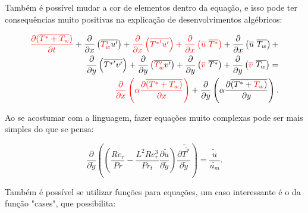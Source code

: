 Também é possível mudar a cor de elementos dentro da equação, e isso pode ter consequências muito positivas na explicação de desenvolvimentos algébricos:

\begin{center}
\begin{equation}
	\begin{split}
	\color{red}\frac{\partial ( \overline{ T^\ast + T_w } ) }{\partial t} \color{black} +
	\frac{\partial{}}{\partial{x}} \left(\overline{ \color{red}T_w^{\prime} \color{black} u^{\prime}}\right) +
	\color{red}\frac{\partial{}}{\partial{x}} \left(\overline{{T^{\ast}}^{\prime} u^{\prime}}\right)+ \color{black}
	\color{red} \frac{\partial{}}{\partial{x}}\left(\overline{u} \ \overline{T^{\ast}}\right) \color{black}+ 
	\frac{\partial{}}{\partial{x}}\left(\overline{u} \ \overline{T_w}\right)+ 
	\\
	\frac{\partial{}}{\partial{y}} \left(\overline{{T^{\ast}}^{\prime} v^{\prime}}\right)+
	\frac{\partial{}}{\partial{y}} \left(\overline{\color{red}T_w^\prime \color{black} v^\prime}\right) + \frac{\partial{}}{\partial{y}}\left(\color{red}\overline{v} \color{black} \ \overline{T^\ast}\right) +
	\frac{\partial{}}{\partial{y}}\left(\color{red}\overline{v}\color{black} \ \overline{T_w}\right) 
	= 
	\\
	\color{red}{\frac{\partial{}}{\partial{x}}} \left(\alpha {\frac{\partial{\overline{(T^\ast + T_w)}}}{\partial{x}}} \right) \color{black}+
	{\frac{\partial{}}{\partial{y}}} \left(\alpha {\frac{\partial{\overline{(T^\ast + \color{red} T_w \color{black})}}}{\partial{y}}} \right) .
	\end{split}
\end{equation}
\end{center}

Ao se acostumar com a linguagem, fazer equações muito complexas pode ser mais simples do que se pensa:

\begin{equation}
	{\frac{\partial{}}{\partial{\tilde{y}}}} \left( \left( \frac{Re_\tau}{Pr}   
	- \frac{{L}^2 Re_\tau ^3}{Pr_t}\frac{\partial \tilde{\overline{u}}}{\partial \tilde{y}} \right) \frac{\partial \tilde{\overline{T^\ast}}}{\partial \tilde{y}} \right)
	= 
	\frac{\tilde{\overline{u}}}{\tilde{u_m}}.
\end{equation}

Também é possível se utilizar funções para equações, um caso interessante é o da função "cases", que possibilita:


